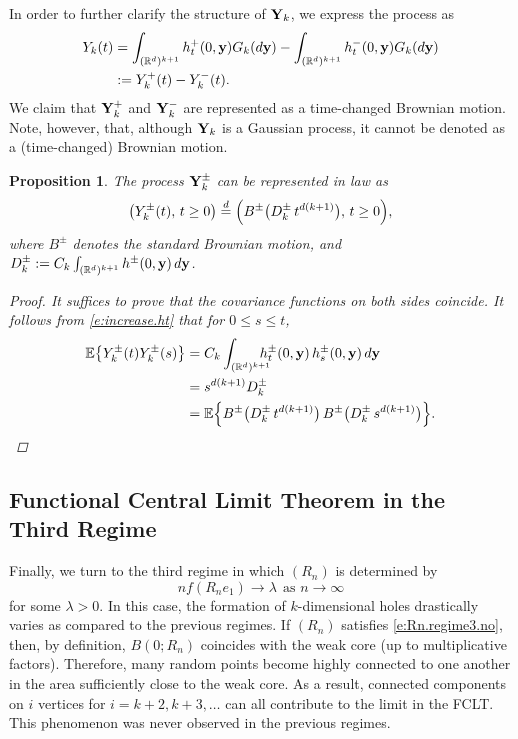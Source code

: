 \documentclass[11pt]{amsart}
\numberwithin{equation}{section}
\theoremstyle{plain}
\newtheorem{proposition}[theorem]{Proposition}
\theoremstyle{definition}
\begin{document}
In order to further clarify the structure of ${{\bf Y}}_k$, we express the process as
\begin{align*}
Y_k(t) &= \int_{({{\mathbb R}}^d)^{k+1}} h_t^+(0,{{\bf y}}) G_k(d{{\bf y}}) - \int_{({{\mathbb R}}^d)^{k+1}} h_t^-(0,{{\bf y}}) G_k(d{{\bf y}}) \\
&:= Y_k^+(t) - Y_k^-(t).
\end{align*}
We claim that ${{\bf Y}}_k^+$ and ${{\bf Y}}_k^-$ are represented as a time-changed Brownian motion. Note, however, that, although ${{\bf Y}}_k$ is a Gaussian process, it cannot be denoted as a (time-changed) Brownian motion.
\begin{proposition}
The process ${{\bf Y}}_k^{\pm}$ can be represented in law as
$$
\bigl( Y_k^{\pm}(t), \, t\geq0 \bigr)\stackrel{d}{=} \Bigl( B^{\pm} \bigl( D_k^{\pm}\, t^{d(k+1)} \bigr), \, t\geq0 \Bigr),
$$
where $B^{\pm}$ denotes the standard Brownian motion, and $D_k^{\pm} := C_k\int_{({{\mathbb R}}^d)^{k+1}}h^{\pm}(0,{{\bf y}})\, d{{\bf y}}$.
\begin{proof}
It suffices to prove that the covariance functions on both sides coincide. It follows from \eqref{e:increase.ht} that for $0\leq s\leq t$,
\begin{align*}
{\mathbb{E}} \bigl\{ Y_k^{\pm}(t)Y_k^{\pm}(s) \bigr\} &= C_k\int_{({{\mathbb R}}^d)^{k+1}} \hspace{-10pt} h_t^{\pm}(0,{{\bf y}})\, h_s^{\pm}(0,{{\bf y}})\, d{{\bf y}} \\
&=s^{d(k+1)} D_k^{\pm} \\
&= {\mathbb{E}} \Bigl\{ B^{\pm}\bigl(D_k^{\pm}\, t^{d(k+1)}\bigr)\, B^{\pm}\bigl(D_k^{\pm}\, s^{d(k+1)}\bigr) \Bigr\}.
\end{align*}
\end{proof}
\end{proposition}

\subsection{Functional Central Limit Theorem in the Third Regime}
\label{s:third.regime}

Finally, we turn to the third regime in which $(R_n)$ is determined by
\begin{equation}  \label{e:Rn.regime3.no}
nf(R_ne_1) \to \lambda \ \ \text{as } n\to\infty
\end{equation}
for some $\lambda>0$.
In this case, the formation of $k$-dimensional holes drastically varies as compared to the previous regimes.
If $(R_n)$ satisfies \eqref{e:Rn.regime3.no}, then, by definition, $B(0; R_n)$ coincides with the weak core (up to multiplicative factors). Therefore, many random points become highly connected to one another in the area sufficiently close to the weak core. As a result, connected components on $i$ vertices for $i=k+2,k+3,\dots$ can all contribute to the limit in the FCLT. This phenomenon was never observed in the previous regimes.
\end{document}
